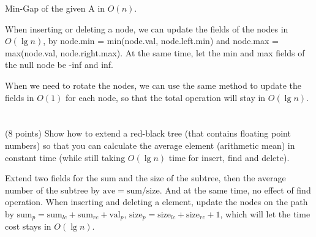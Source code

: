 \documentclass[paper=a4, fontsize=11pt]{scrartcl} %
\begin{document}
\begin{algorithm}[H]
  \caption{Min-Gap of the given A in $O(n)$.}
\end{algorithm}

When inserting or deleting a node, we can update the fields of the
nodes in $O(\lg{n})$, by node.min = min(node.val, node.left.min) and
node.max = max(node.val, node.right.max). At the same time, let the
min and max fields of the null node be -inf and inf.

When we need to rotate the nodes, we can use the same method to
update the fields in $O(1)$ for each node, so that the total operation
will stay in $O(\lg{n})$.


\section{}

\begin{fancyquotes}
  (8 points) Show how to extend a red-black tree (that contains
  floating point numbers) so that you can calculate the average
  element (arithmetic mean) in constant time (while still taking
  $O(\lg{n})$ time for insert, find and delete).
\end{fancyquotes}

Extend two fields for the sum and the size of the subtree, then the
average number of the subtree by $\text{ave} = \text{sum} / \text{size}$.
And at the same time, no effect of find operation.
When inserting and deleting a element, update the nodes on the path
by $\text{sum}_p = \text{sum}_{lc} + \text{sum}_{rc} + \text{val}_p$,
$\text{size}_p = \text{size}_{lc} + \text{size}_{rc} + 1$, which will
let the time cost stays in $O(\lg{n})$.




\section{}
\end{document}

